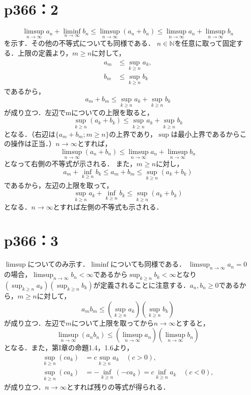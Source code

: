 \section*{p366：2}

\begin{tproof}
    \[
        \limsup _{n \to \infty} a_n + \liminf _{n \to \infty} b_n \leq \limsup _{n \to \infty} (a_n + b_n) \leq \limsup _{n \to \infty} a_n + \limsup _{n \to \infty} b_n
    \]
    を示す．その他の不等式についても同様である．
    $n \in \mathbb{N}$を任意に取って固定する．上限の定義より，$m \geq n$に対して，
    \begin{align*}
        a_m & \leq \sup _{k \geq n} a_k, \\
        b_m & \leq \sup _{k \geq n} b_k
    \end{align*}
    であるから，
    \[
        a_m + b_m \leq \sup _{k \geq n} a_k + \sup _{k \geq n} b_k
    \]
    が成り立つ．左辺でmについての上限を取ると，
    \[
        \sup _{k \geq n} (a_k + b_k) \leq \sup _{k \geq n} a_k + \sup _{k \geq n} b_k
    \]
    となる．（右辺は$\{a_m + b_m; m \geq n\}$の上界であり，$\sup$は最小上界であるからこの操作は正当．）$n \to \infty$とすれば，
    \[
        \limsup _{n \to \infty} (a_n + b_n) \leq \limsup _{n \to \infty} a_n + \limsup _{n \to \infty} b_n
    \]
    となって右側の不等式が示される．
    また，$m \geq n$に対し，
    \[
        a_m + \inf _{k \geq n} b_k \leq a_m + b_m \leq \sup _{k \geq n} (a_k + b_k)
    \]
    であるから，左辺の上限を取って，
    \[
        \sup _{k \geq n} a_k + \inf _{k \geq n} b_k \leq \sup _{k \geq n} (a_k + b_k)
    \]
    となる．$n \to \infty$とすれば左側の不等式も示される．
\end{tproof}

\section*{p366：3}

\begin{tproof}
    $\limsup$についてのみ示す．$\liminf$についても同様である．
    $\limsup_{n \to \infty} a_n = 0$の場合，$\limsup_{n \to \infty} b_n < \infty$であるから$\sup_{k \geq n} b_k < \infty$となり$\left(\sup _{k \geq n} a_k\right) \left(\sup _{k \geq n} b_k\right)$が定義されることに注意する．$a_n, b_n \geq 0$であるから，$m \geq n$に対して，
    \[
        a_m b_m \leq \left(\sup _{k \geq n} a_k\right) \left(\sup _{k \geq n} b_k\right)
    \]
    が成り立つ．左辺で$m$について上限を取ってから$n \to \infty$とすると，
    \[
        \limsup_{n \to \infty} (a_n b_n) \leq \left(\limsup _{n \to \infty} a_n\right) \left(\limsup_{n \to \infty} b_n\right)
    \]
    となる．また，第I章の命題1.4，1.6より，
    \begin{align*}
        \sup_{k \geq n} (c a_k) & = c\sup_{k \geq n} a_k \quad (c > 0),                             \\
        \sup_{k \geq n} (c a_k) & = -\inf_{k \geq n} (-c a_k) = c\inf_{k \geq n} a_k \quad (c < 0),
    \end{align*}
    が成り立つ．$n \to \infty$とすれば残りの等式が得られる．
\end{tproof}

